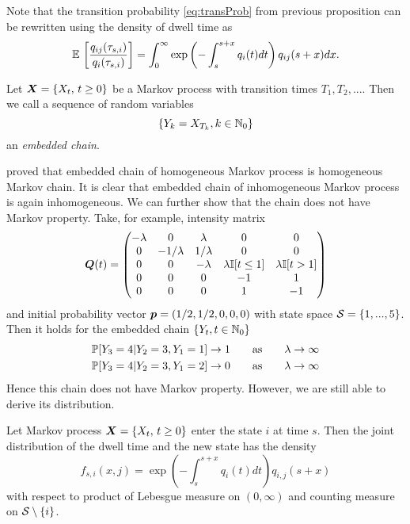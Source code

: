 {Note that the transition probability \eqref{eq:transProb} from previous proposition can be rewritten using the density of dwell time as
\[
	\E \left[ \frac{q_{ij}(\tau_{s,i})}{q_i(\tau_{s,i})} \right] =
	\int_0^\infty \exp \left(- \int_{s}^{s+x} q_i(t) dt \right) q_{ij}(s+x) dx.
\]

\begin{definition}
	\label{def:embedded}
	Let $\procX$ be a Markov process with transition times $T_1, T_2, ...$. Then we call a sequence of random variables
	\[
		\{ Y_k = X_{T_k}, k \in \N_0 \}
	\]
	an \emph{embedded chain}.
\end{definition}

\cite{PraskovaLachout12} proved that embedded chain of homogeneous Markov process is homogeneous Markov chain.
It is clear that embedded chain of inhomogeneous Markov process is again inhomogeneous.
We can further show that the chain does not have Markov property.
Take, for example, intensity matrix
\[
	\m{Q} (t) = 
		\begin{pmatrix}
			- \lambda & 0             & \lambda     & 0 & 0 \\
			0         & - 1 / \lambda & 1 / \lambda & 0 & 0 \\
			0         & 0             & - \lambda   & \lambda \mathbb{I} [t \leq 1] & \lambda \mathbb{I} [t > 1] \\
			0         & 0             & 0           & -1 & 1 \\
			0         & 0             & 0           & 1 & -1 \\
		\end{pmatrix}
\]
and initial probability vector $\m{p} = (1/2, 1/2, 0, 0, 0)$ with state space $\S = \{1, ..., 5 \}$.
Then it holds for the embedded chain $\{Y_t, t \in \N_0 \}$
\begin{align*}
	\pr [ Y_3 = 4 \vert Y_2 = 3, Y_1 = 1] \to 1 \qquad \text{as} \qquad \lambda \to \infty \\
	\pr [ Y_3 = 4 \vert Y_2 = 3, Y_1 = 2] \to 0 \qquad \text{as} \qquad \lambda \to \infty
\end{align*}
Hence this chain does not have Markov property.
However, we are still able to derive its distribution.

\begin{corollary}
	Let Markov process $\procX$ enter the state $i$ at time $s$. Then the joint distribution of the dwell time and the new state has the density
	\[
		f_{s,i} (x, j) = \exp \left(- \int_{s}^{s+x} q_i(t) dt \right) q_{i,j}(s+x)
	\]
	with respect to product of Lebesgue measure on $(0, \infty)$ and counting measure on $\S \setminus \{i\}$.
\end{corollary}

}
